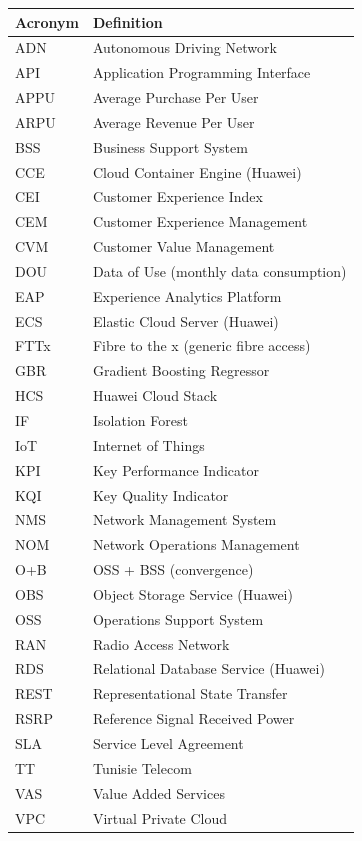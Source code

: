 \begin{longtable}{@{}ll@{}}
\toprule
\textbf{Acronym} & \textbf{Definition} \\
\midrule
\endhead
ADN   & Autonomous Driving Network \\
API   & Application Programming Interface \\
APPU  & Average Purchase Per User \\
ARPU  & Average Revenue Per User \\
BSS   & Business Support System \\
CCE   & Cloud Container Engine (Huawei) \\
CEI   & Customer Experience Index \\
CEM   & Customer Experience Management \\
CVM   & Customer Value Management \\
DOU   & Data of Use (monthly data consumption) \\
EAP   & Experience Analytics Platform \\
ECS   & Elastic Cloud Server (Huawei) \\
FTTx  & Fibre to the x (generic fibre access) \\
GBR   & Gradient Boosting Regressor \\
HCS   & Huawei Cloud Stack \\
IF    & Isolation Forest \\
IoT   & Internet of Things \\
KPI   & Key Performance Indicator \\
KQI   & Key Quality Indicator \\
NMS   & Network Management System \\
NOM   & Network Operations Management \\
O+B   & OSS + BSS (convergence) \\
OBS   & Object Storage Service (Huawei) \\
OSS   & Operations Support System \\
RAN   & Radio Access Network \\
RDS   & Relational Database Service (Huawei) \\
REST  & Representational State Transfer \\
RSRP  & Reference Signal Received Power \\
SLA   & Service Level Agreement \\
TT    & Tunisie Telecom \\
VAS   & Value Added Services \\
VPC   & Virtual Private Cloud \\
\bottomrule
\end{longtable}

\newpage
